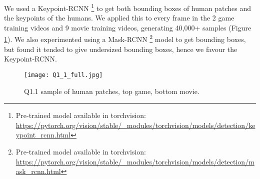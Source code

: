 We used a Keypoint-RCNN
\footnote{Pre-trained model available in torchvision: \url{https://pytorch.org/vision/stable/_modules/torchvision/models/detection/keypoint_rcnn.html}}
 to get both bounding boxes of human patches and the keypoints of the humans.
We applied this to every frame in the 2 game training videos and 9 movie training videos, generating 40,000+ samples (Figure \ref{fig:Q1_1}).
We also experimented using a Mask-RCNN
\footnote{Pre-trained model available in torchvision: \url{https://pytorch.org/vision/stable/_modules/torchvision/models/detection/mask_rcnn.html}}
 model to get bounding boxes, but found it tended to give undersized bounding boxes, hence we favour the Keypoint-RCNN.



\begin{figure}[h!]
  \begin{center}
  \texttt{[image: Q1\_1\_full.jpg]}
    \caption{Q1.1 sample of human patches, top game, bottom movie.}
    \label{fig:Q1_1}
  \end{center}
  \end{figure}